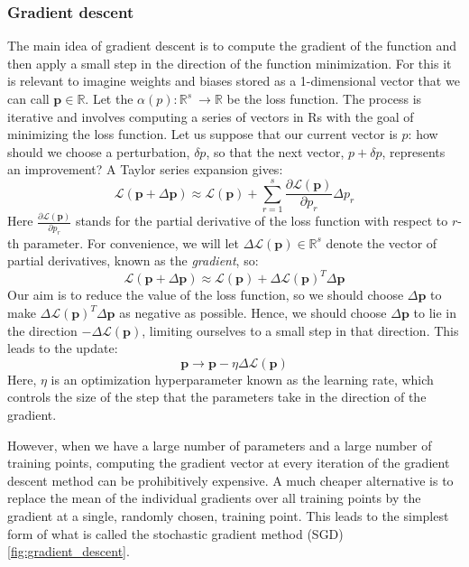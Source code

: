 \subsubsection{Gradient descent}
 The main idea of gradient descent is to compute the gradient of the function and then apply a small step in the direction of the function minimization.
 For this it is relevant to imagine weights and biases stored as a 1-dimensional vector that we can call $\textbf{p} \in \mathbb{R}$.
Let the $\alpha (p):\mathbb{R}^s\ \longrightarrow \mathbb{R}$ be the loss function.
The process is iterative and involves computing a series of vectors in Rs with the goal of minimizing the loss function. Let us suppose that our current vector is \textbf{$p$}: how should we choose a perturbation,
$\delta p$, so that the next vector, $p+ \delta p$, represents an improvement? A Taylor series expansion
gives:
$$
\mathcal{L}(\mathbf{p}+\Delta \mathbf{p}) \approx \mathcal{L}(\mathbf{p})+\sum_{r=1}^s \frac{\partial \mathcal{L}(\mathbf{p})}{\partial p_r} \Delta p_r
$$
Here $ \frac{\partial \mathcal{L}(\mathbf{p})}{\partial p_r} $ stands for the partial derivative of the loss function with respect to $\textit{r}$-th parameter.  For convenience, we will let $\Delta \mathcal{L}(\mathbf{p}) \in \mathbb{R}^s$ denote the vector of partial derivatives,
known as the \textit{gradient}, so:
$$
\mathcal{L}(\mathbf{p}+\Delta \mathbf{p}) \approx \mathcal{L}(\mathbf{p})+\Delta \mathcal{L}(\mathbf{p})^T \Delta \mathbf{p}
$$
Our aim is to reduce the value of the loss function, so we should choose $\Delta \mathbf{p}$ to make $\Delta \mathcal{L}(\mathbf{p})^T \Delta \mathbf{p}$ as negative as possible. Hence, we should choose $\Delta \mathbf{p}$ to lie in the direction $-\Delta \mathcal{L}(\mathbf{p})$, limiting ourselves to a small step in that direction. This leads to the update:
$$
\mathbf{p} \longrightarrow \mathbf{p}-\eta \Delta \mathcal{L}(\mathbf{p})
$$
Here, $\eta$ is an optimization hyperparameter known as the learning rate, which controls the size of the step that the parameters take in the direction of the gradient.

However, when we have a large number of parameters and a large number of training points, computing the gradient vector at every iteration of the gradient descent method can be prohibitively expensive. A much cheaper alternative is to replace the mean of the individual gradients over all training points by the gradient at a single, randomly chosen, training point. This leads to the simplest form of what is called the stochastic gradient method (SGD) \ref{fig:gradient_descent}.

